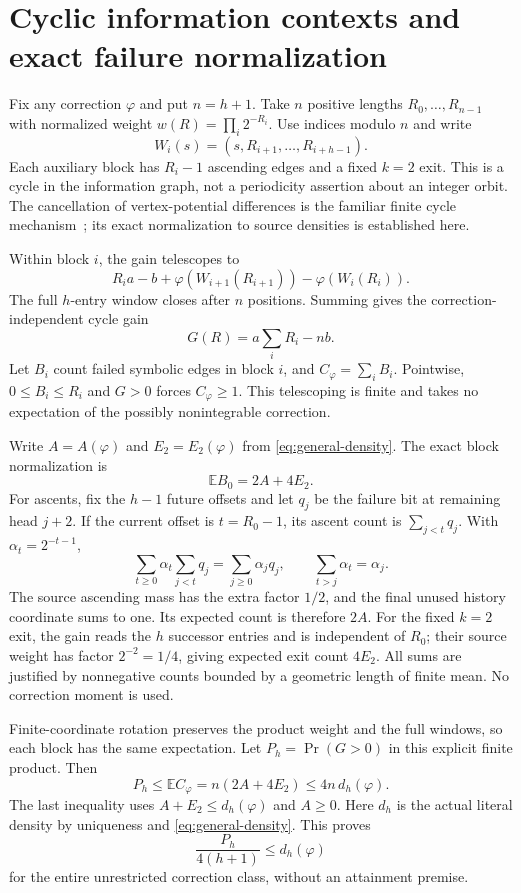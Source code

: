 \documentclass[11pt,letterpaper]{article}
\begin{document}
\section{Cyclic information contexts and exact failure normalization}
Fix any correction $\varphi$ and put $n=h+1$. Take $n$ positive lengths
$R_0,\ldots,R_{n-1}$ with normalized weight $w(R)=\prod_i2^{-R_i}$.
Use indices modulo $n$ and write
\[
 W_i(s)=(s,R_{i+1},\ldots,R_{i+h-1}).
\]
Each auxiliary block has
$R_i-1$ ascending edges and a fixed $k=2$ exit. This is a cycle in the
information graph, not a periodicity assertion about an integer orbit.
The cancellation of vertex-potential differences is the familiar finite
cycle mechanism~\cite{karp}; its exact normalization to source densities is
established here.

Within block $i$, the gain telescopes to
\[
 R_i a-b+\varphi(W_{i+1}(R_{i+1}))-\varphi(W_i(R_i)).
\]
The full $h$-entry window closes after $n$ positions. Summing gives the
correction-independent cycle gain
\begin{equation}\label{eq:rate-cycle}
 G(R)=a\sum_i R_i-nb.
\end{equation}
Let $B_i$ count failed symbolic edges in block $i$, and $C_\varphi=\sum_iB_i$.
Pointwise, $0\le B_i\le R_i$ and $G>0$ forces $C_\varphi\ge1$.
This telescoping is finite and takes no expectation of the possibly
nonintegrable correction.

Write $A=A(\varphi)$ and $E_2=E_2(\varphi)$ from
\eqref{eq:general-density}. The exact block normalization is
\begin{equation}\label{eq:two-four}
 \mathbb E B_0=2A+4E_2.
\end{equation}
For ascents, fix the $h-1$ future offsets and let $q_j$ be the failure bit
at remaining head $j+2$. If the current offset is $t=R_0-1$, its ascent count
is $\sum_{j<t}q_j$. With $\alpha_t=2^{-t-1}$,
\[
 \sum_{t\ge0}\alpha_t\sum_{j<t}q_j
 =\sum_{j\ge0}\alpha_jq_j,\qquad \sum_{t>j}\alpha_t=\alpha_j.
\]
The source ascending mass has the extra factor $1/2$, and the final unused
history coordinate sums to one. Its expected count is therefore $2A$.
For the fixed $k=2$ exit, the gain reads the $h$ successor entries and is
independent of $R_0$; their source weight has factor $2^{-2}=1/4$, giving
expected exit count $4E_2$. All sums are justified by nonnegative counts
bounded by a geometric length of finite mean. No correction moment is used.

Finite-coordinate rotation preserves the product weight and the full windows,
so each block has the same expectation. Let $P_h=\Pr(G>0)$ in this explicit
finite product. Then
\[
 P_h\le\mathbb E C_\varphi=n(2A+4E_2)\le4n\,d_h(\varphi).
\]
The last inequality uses $A+E_2\le d_h(\varphi)$ and $A\ge0$.
Here $d_h$ is the actual literal density by uniqueness and
\eqref{eq:general-density}. This proves
\begin{equation}\label{eq:cycle-density-lower}
 \frac{P_h}{4(h+1)}\le d_h(\varphi)
\end{equation}
for the entire unrestricted correction class, without an attainment premise.
\end{document}
